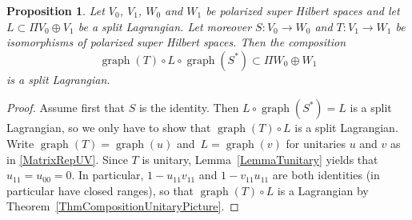 \documentclass[pdftex]{sigma}
\numberwithin{equation}{section}
\newtheorem{Proposition}[Theorem]{Proposition}
 { \theoremstyle{definition}
\newtheorem{Definition}[Theorem]{Definition}
\newtheorem{Note}[Theorem]{Note}
\newtheorem{Example}[Theorem]{Example}
\newtheorem{Construction}[Theorem]{Construction}
\newtheorem{Observation}[Theorem]{Observation}
\newtheorem{Remark}[Theorem]{Remark} }
\DeclareMathOperator{\graph}{\mathrm{graph}}
\begin{document}
\begin{Proposition}
\label{PropCompositionWithGraph}
Let $V_0$, $V_1$, $W_0$ and $W_1$ be polarized super Hilbert spaces and let $L \subset \Pi V_0 \oplus V_1$ be a split Lagrangian.
Let moreover $S\colon V_0 \to W_0$ and $T\colon V_1 \to W_1$ be isomorphisms of polarized super Hilbert spaces.
Then the composition
\begin{equation*}
\graph(T) \circ L \circ \graph(S^*) \subset \Pi W_0 \oplus W_1
\end{equation*}
is a split Lagrangian.
\end{Proposition}

\begin{proof}
Assume first that $S$ is the identity.
Then $L \circ \graph(S^*) = L$ is a split Lagrangian, so we only have to show that $\graph(T) \circ L$ is a split Lagrangian.
Write $\graph(T) = \graph(u)$ and~${L = \graph(v)}$ for unitaries $u$ and $v$ as in \eqref{MatrixRepUV}.
Since $T$ is unitary, Lemma~\ref{LemmaTunitary} yields that~${u_{11} = u_{00} = 0}$.
In particular, $1-u_{11}v_{11}$ and $1-v_{11}u_{11}$ are both identities (in particular have closed ranges), so that $\graph(T) \circ L$ is a Lagrangian by Theorem~\ref{ThmCompositionUnitaryPicture}.


\end{proof}
\end{document}
